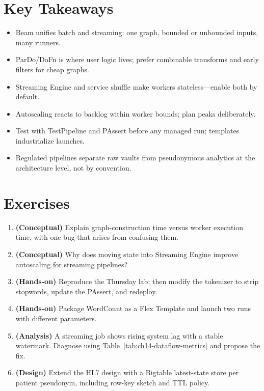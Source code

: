 \section*{Key Takeaways}
\begin{itemize}
    \item Beam unifies batch and streaming: one graph, bounded or unbounded inputs, many runners.
    \item ParDo/DoFn is where user logic lives; prefer combinable transforms and early filters for cheap graphs.
    \item Streaming Engine and service shuffle make workers stateless---enable both by default.
    \item Autoscaling reacts to backlog within worker bounds; plan peaks deliberately.
    \item Test with TestPipeline and PAssert before any managed run; templates industrialize launches.
    \item Regulated pipelines separate raw vaults from pseudonymous analytics at the architecture level, not by convention.
\end{itemize}

\section{Exercises}
\begin{enumerate}
    \item \textbf{(Conceptual)} Explain graph-construction time versus worker execution time, with one bug that arises from confusing them.
    \item \textbf{(Conceptual)} Why does moving state into Streaming Engine improve autoscaling for streaming pipelines?
    \item \textbf{(Hands-on)} Reproduce the Thursday lab; then modify the tokenizer to strip stopwords, update the PAssert, and redeploy.
    \item \textbf{(Hands-on)} Package WordCount as a Flex Template and launch two runs with different parameters.
    \item \textbf{(Analysis)} A streaming job shows rising system lag with a stable watermark. Diagnose using Table~\ref{tab:ch14-dataflow-metrics} and propose the fix.
    \item \textbf{(Design)} Extend the HL7 design with a Bigtable latest-state store per patient pseudonym, including row-key sketch and TTL policy.
\end{enumerate}
